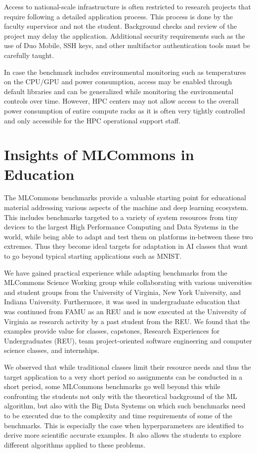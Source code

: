 \documentclass[utf8]{FrontiersinVancouver} %
\begin{document}
Access to national-scale infrastructure is often restricted to
research projects that require following a detailed application
process. This process is done by the faculty supervisor and not the
student. Background checks and review of the project may delay the
application. Additional security requirements such as the use of Duo Mobile,
SSH keys, and other multifactor authentication tools must be carefully taught.

In case the benchmark includes environmental monitoring such as
temperatures on the CPU/GPU and power consumption, access may be
enabled through default libraries and can be generalized while
monitoring the environmental controls over time. However, HPC centers
may not allow access to the overall power consumption of entire
compute racks as it is often very tightly controlled and only
accessible for the HPC operational support staff.

\section{Insights of MLCommons in Education}
\label{sec:edu-mlcommons-insights}

The MLCommons benchmarks provide a valuable starting point for
educational material addressing various aspects of the machine and
deep learning ecosystem. This includes benchmarks targeted to a
variety of system resources from tiny devices to the largest High
Performance Computing and Data Systems in the world, while being able
to adapt and test them on platforms in-between these two
extremes. Thus they become ideal targets for adaptation in AI classes
that want to go beyond typical starting applications such as MNIST.

We have gained practical experience while adapting benchmarks from the
MLCommons Science Working group while collaborating with various
universities and student groups from the University of Virginia, New
York University, and Indiana University. Furthermore, it was used in
undergraduate education that was continued from FAMU as an REU and is
now executed at the University of Virginia as research activity by a
past student from the REU. We found that the examples provide value
for classes, capstones, Research Experiences for Undergraduates (REU),
team project-oriented software engineering and computer science
classes, and internships.

We observed that while traditional classes limit their resource needs
and thus the target application to a very short period so assignments
can be conducted in a short period, some MLCommons benchmarks go well
beyond this while confronting the students not only with
the theoretical background of the ML algorithm, but also with the Big Data
Systems on which such benchmarks need to be executed due to the
complexity and time requirements of some of the benchmarks. This is
especially the case when hyperparameters are identified to derive more
scientific accurate examples. It also allows the students to explore
different algorithms applied to these problems.
\end{document}

